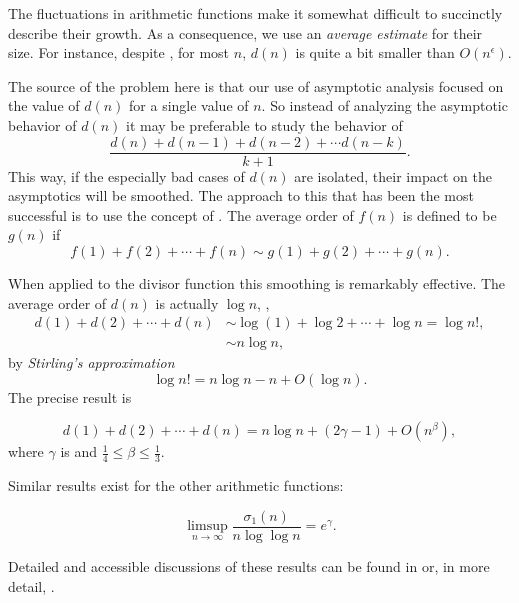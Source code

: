 The fluctuations in arithmetic functions make it somewhat difficult to
succinctly describe their growth.  As a consequence, we use an {\em
average estimate} for their size.  For instance, despite
, for most $n$, $d(n)$ is quite a bit
smaller than $O(n^{\epsilon})$. 

The source of the problem here is that our use of asymptotic analysis
focused on the value of $d(n)$ for a single value of $n$.  So instead
of analyzing the asymptotic behavior of $d(n)$ it may be preferable to
study the behavior of 
\[
\frac{d(n) + d(n-1) + d(n-2) + \cdots d(n-k)}{k+1}.
\]
This way, if the especially bad cases of $d(n)$ are isolated, their
impact on the asymptotics will be smoothed.  The approach to this that
has been the most successful is to use the concept of .  The average order of $f(n)$ is defined to be $g(n)$ if
\[
f(1)+ f(2) +\cdots + f(n) \sim g(1)+ g(2) + \cdots + g(n).
\]

When applied to the divisor function this smoothing is remarkably
effective.  The average order of $d(n)$ is actually $\log n$, \ie,
\[
\begin{aligned}
  d(1) + d(2) +\cdots + d(n) 
   &\sim \log(1) + \log 2 +\cdots + \log n = \log n!,\\
   & \sim n \log n,
\end{aligned}
\]
by {\em Stirling's approximation}
\begin{equation} \label{Stirling:Eqc}
\log n! = n \log n - n + O(\log n).
\end{equation}
The precise result is 

\begin{proposition}
\[
d(1) + d(2) +\cdots + d(n) = n\log n + (2\gamma -1) + O(n^{\beta}),
\]
where $\gamma$ is  and $\frac{1}{4} \le \beta \le
\frac{1}{3}$.
\end{proposition}

\medskip
Similar results exist for the other arithmetic functions: 

\begin{proposition}
\[
\mathop{\limsup}\limits_{n\rightarrow\infty} \frac{\sigma_1(n)}{n \log \log n}
   = e^{\gamma}.
\]
\end{proposition}

Detailed and accessible discussions of these results can be found in
\cite{Hardy:Wright} or, in more detail, \cite{Landau:Primzahlen}.

